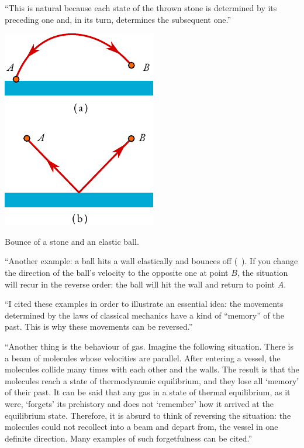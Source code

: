 \begin{dialogue}
\prtnr ``This is natural because each state of the thrown stone is
determined by its preceding one and, in its turn, determines the subsequent one.''
\begin{marginfigure}%
\centering
\includegraphics[width=\textwidth]{figures/reflect.pdf}
\caption{Bounce of a stone and an elastic ball.\label{reflect}}
\end{marginfigure}

\athr ``Another example: a ball hits a wall elastically and bounces
off (~). If you change the direction of the ball's velocity to the opposite one at point $B$, the situation will recur in the reverse order: the ball will hit the wall and return to point $A$.

``I cited these examples in order to illustrate an essential idea: the movements determined by the laws of classical mechanics have a kind of ``memory'' of the past. This is why these movements can be reversed.''

``Another thing is the behaviour of gas. Imagine the following situation. There is a beam of molecules whose velocities are parallel. After entering a vessel, the molecules collide many times with each other and the walls. The result is that the molecules reach a state of thermodynamic equilibrium, and they lose all `memory' of their past. It can be said that any gas in a state of thermal equilibrium, as it were, `forgets' its prehistory and does not `remember' how it arrived at the equilibrium state. Therefore, it is absurd to think of reversing the situation: the molecules could not recollect into a beam and depart from, the vessel in one definite direction. Many examples of such forgetfulness can be cited.''


\end{dialogue}
